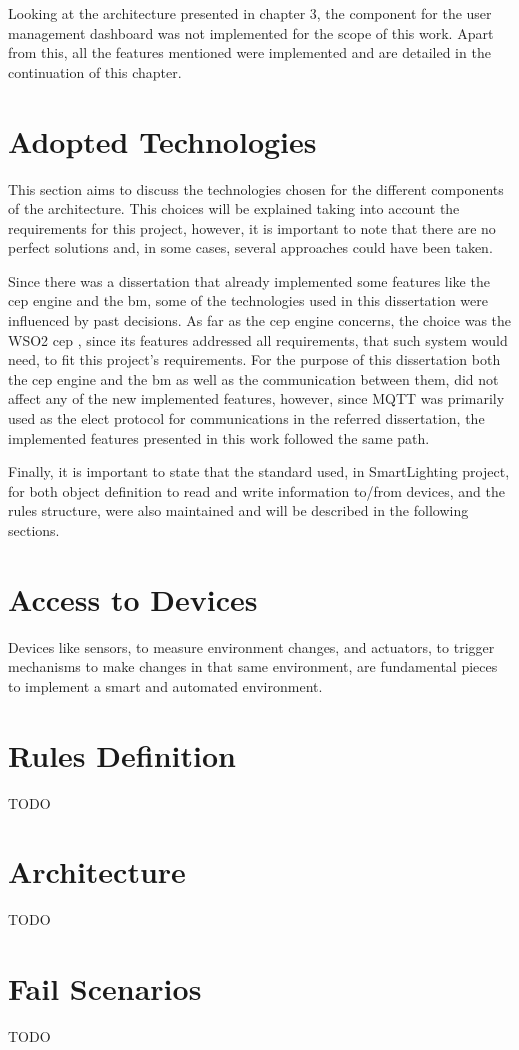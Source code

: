 Looking at the architecture presented in chapter 3, the component for the user management dashboard was not implemented for the scope of this work. Apart from this, all the features mentioned were implemented and are detailed in the continuation of this chapter.



\section{Adopted  Technologies}
\label{implementation:technologies}

This section aims to discuss the technologies chosen for the different components of the architecture. This choices will be explained taking into account the requirements for this project, however, it is important to note that there are no perfect solutions and, in some cases, several approaches could have been taken.

Since there was a dissertation that already implemented some features like the \ac{cep} engine and the \ac{bm}, some of the technologies used in this dissertation were influenced by past decisions. As far as the \ac{cep} engine concerns, the choice was the WSO2 \ac{cep} \cite{wso2}, since its features addressed all requirements, that such system would need, to fit this project's requirements. For the purpose of this dissertation both the \ac{cep} engine and the \ac{bm} as well as the communication between them, did not affect any of the new implemented features, however, since MQTT was primarily used as the elect protocol for communications in the referred dissertation, the implemented features presented in this work followed the same path.

Finally, it is important to state that the standard used, in SmartLighting project, for both object definition to read and write information to/from devices, and the rules structure, were also maintained and will be described in the following sections. 

\section{Access to Devices}
\label{implementation:devices}

Devices like sensors, to measure environment changes, and actuators, to trigger mechanisms to make changes in that same environment, are fundamental pieces to implement a smart and automated environment. 

 
\section{Rules Definition}
\label{implementation:rules}
TODO
\section{Architecture}
\label{implementation:architecture}
TODO
\section{Fail Scenarios}
\label{implementation:scenarios}
TODO


